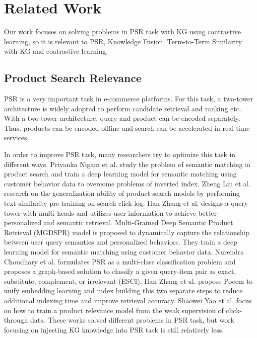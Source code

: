 \section{Related Work}

Our work focuses on solving problems in PSR task with KG using contrastive learning, so it is relevant to PSR, Knowledge Fusion, Term-to-Term Similarity with KG and contrastive learning.

\subsection{Product Search Relevance} 
PSR is a very important task in e-commerce platforms. For this task, a two-tower architecture is widely adopted to perform candidate retrieval and ranking etc. With a two-tower architecture, query and product can be encoded separately. Thus, products can be encoded offline and search can be accelerated in real-time services\cite{liu2022}.

In order to improve PSR task, many researchers try to optimize this task in different ways. Priyanka Nigam et al. \cite{priyanka2019} study the problem of semantic matching in product search and train a deep learning model for semantic matching using customer behavior data to overcome problems of inverted index. Zheng Liu et al. \cite{liu2022} research on the generalization ability of product search models by performing text similarity pre-training on search click log. Han Zhang et al. \cite{zhang2020} designs a query tower with multi-heads and utilizes user information to achieve better personalized and semantic retrieval. Multi-Grained Deep Semantic Product Retrieval (MGDSPR) model \cite{senli} is proposed to dynamically capture the relationship between user query semantics and personalized behaviors. They train a deep learning model for semantic matching using customer behavior data. Nurendra Choudhary et al. \cite{choudhary2022} formulates PSR as a multi-class classification problem and proposes a graph-based solution to classify a given query-item pair as exact, substitute, complement, or irrelevant (ESCI). Han Zhang et al. \cite{zhang2021joint} propose Poeem to unify embedding learning and index building this two separate steps to reduce additional indexing time and improve retrieval accuracy. Shaowei Yao et al. \cite{yao2021learning} focus on how to train a product relevance model from the weak supervision of click-through data. These works solved different problems in PSR task, but work focusing on injecting KG knowledge into PSR task is still relatively less.

